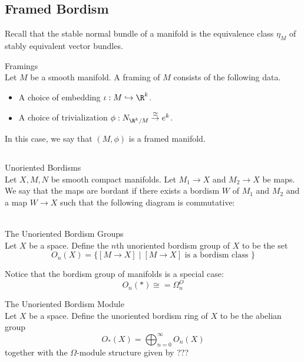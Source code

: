 \documentclass[a4paper]{article}
\begin{document}
\subsection{Framed Bordism}
Recall that the stable normal bundle of a manifold is the equivalence class $\eta_M$ of stably equivalent vector bundles. 

\begin{defn}{Framings}{}\\
Let $M$ be a smooth manifold. A framing of $M$ consists of the following data. 
\begin{itemize}
\item A choice of embedding $\iota:M\hookrightarrow\R^k$. 
\item A choice of trivialization $\phi:N_{\R^k/M}\overset{\cong}{\to}e^k$.  
\end{itemize}
In this case, we say that $(M,\phi)$ is a framed manifold. 
\end{defn}

\subsection{}
\begin{defn}{Unoriented Bordisms}{}\\
Let $X,M,N$ be smooth compact manifolds. Let $M_1\to X$ and $M_2\to X$ be maps. We say that the maps are bordant if there exists a bordism $W$ of $M_1$ and $M_2$ and a map $W\to X$ such that the following diagram is commutative: \\
\\
\end{defn}

\begin{defn}{The Unoriented Bordism Groups}{}\\
Let $X$ be a space. Define the $n$th unoriented bordism group of $X$ to be the set $$O_n(X)=\{[M\to X]\;|\;[M\to X]\text{ is a bordism class }\}$$
\end{defn}

Notice that the bordism group of manifolds is a special case: $$O_n(\ast)\cong=\Omega_n^O$$

\begin{defn}{The Unoriented Bordism Module}{}\\
Let $X$ be a space. Define the unoriented bordism ring of $X$ to be the abelian group $$O_\ast(X)=\bigoplus_{n=0}^\infty O_n(X)$$ together with the $\Omega$-module structure given by ???
\end{defn}
\end{document}
